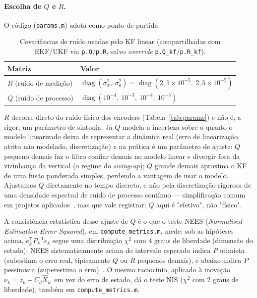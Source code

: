 \documentclass[brazil, 12pt]{article}
\begin{document}
\paragraph{Escolha de $Q$ e $R$.} O código (\texttt{params.m}) adota como
ponto de partida

\begin{table}[H]
\centering
\begin{tabular}{l l}
\hline
\textbf{Matriz} & \textbf{Valor} \\
\hline
$R$ (ruído de medição)  & $\operatorname{diag}(\sigma_x^2,\ \sigma_\theta^2) = \operatorname{diag}(2{,}5\times10^{-5},\ 2{,}5\times10^{-5})$ \\
$Q$ (ruído de processo) & $\operatorname{diag}(10^{-4},\ 10^{-3},\ 10^{-4},\ 10^{-3})$ \\
\hline
\end{tabular}
\caption{Covariâncias de ruído usadas pelo KF linear (compartilhadas com EKF/UKF
via \texttt{p.Q}/\texttt{p.R}, salvo \emph{override} \texttt{p.Q\_kf}/\texttt{p.R\_kf}).}
\label{tab:params-qr}
\end{table}

$R$ decorre direto do ruído físico dos encoders (Tabela~\ref{tab:params}) e
não é, a rigor, um parâmetro de sintonia. Já $Q$ modela a incerteza sobre o
quanto o modelo linearizado deixa de representar a dinâmica real (erro de
linearização, atrito não modelado, discretização) e na prática é um parâmetro
de ajuste: $Q$ pequeno demais faz o filtro confiar demais no modelo linear e
divergir fora da vizinhança da vertical (o regime do \emph{swing-up}); $Q$
grande demais aproxima o KF de uma fusão ponderada simples, perdendo a
vantagem de usar o modelo. Ajustamos $Q$ diretamente no tempo discreto, e não
pela discretização rigorosa de uma densidade espectral de ruído de processo
contínuo --- simplificação comum em projetos aplicados~\cite{simon2006}, mas
que vale registrar: $Q$ aqui é "efetivo", não "físico".

A consistência estatística desse ajuste de $Q$ é o que o teste NEES
(\emph{Normalised Estimation Error Squared}), em \texttt{compute\_metrics.m},
mede: sob as hipóteses acima, $e_k^{\mathsf T}P_k^{-1}e_k$ segue uma
distribuição $\chi^2$ com 4 graus de liberdade (dimensão do estado); NEES
sistematicamente acima do intervalo esperado indica $P$ otimista (subestima o
erro real, tipicamente $Q$ ou $R$ pequenos demais), e abaixo indica $P$
pessimista (superestima o erro)~\cite{simon2006}. O mesmo raciocínio, aplicado
à inovação $\nu_k=z_k-C_d\hat X_k^{-}$ em vez do erro de estado, dá o teste
NIS ($\chi^2$ com 2 graus de liberdade), também em \texttt{compute\_metrics.m}.
\end{document}
